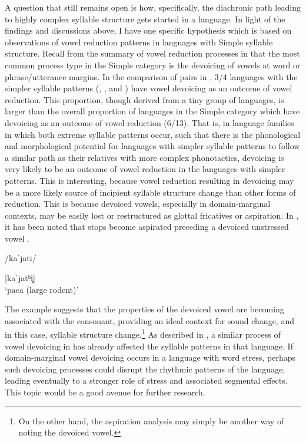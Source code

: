   A question that still remains open is how, specifically, the diachronic path leading to highly complex syllable structure gets started in a language. In light of the findings and discussions above, I have one specific hypothesis which is based on observations of vowel reduction patterns in languages with Simple syllable structure. Recall from the summary of vowel reduction processes in  that the most common process type in the Simple category is the devoicing of vowels at word or phrase/utterance margins. In the comparison of pairs in , 3/4 languages with the simpler syllable patterns (, , and ) have vowel devoicing as an outcome of vowel reduction. This proportion, though derived from a tiny group of languages, is larger than the overall proportion of languages in the Simple category which have devoicing as an outcome of vowel reduction (6/13). That is, in language families in which both extreme syllable patterns occur, such that there is the phonological and morphological potential for languages with simpler syllable patterns to follow a similar path as their relatives with more complex phonotactics, devoicing is very likely to be an outcome of vowel reduction in the languages with simpler patterns. This is interesting, because vowel reduction resulting in devoicing may be a more likely source of incipient syllable structure change than other forms of reduction. This is because devoiced vowels, especially in domain-marginal contexts, may be easily lost or restructured as glottal fricatives or aspiration. In , it has been noted that stops become aspirated preceding a devoiced unstressed vowel .

\ea\label{ex:8.6}

/kaˈjati/

[kaˈjatʰi̥]\\
\glt ‘paca (large rodent)’
\citep[60--61]{Facundes2000} 
\z

  The  example suggests that the properties of the devoiced vowel are becoming associated with the consonant, providing an ideal context for sound change, and in this case, syllable structure change.\footnote{{On the other hand, the aspiration analysis may simply be another way of noting the devoiced vowel.}} As described in , a similar process of vowel devoicing in  has already affected the syllable patterns in that language. If domain-marginal vowel devoicing occurs in a language with word stress, perhaps such devoicing processes could disrupt the rhythmic patterns of the language, leading eventually to a stronger role of stress and associated segmental effects. This topic would be a good avenue for further research.

